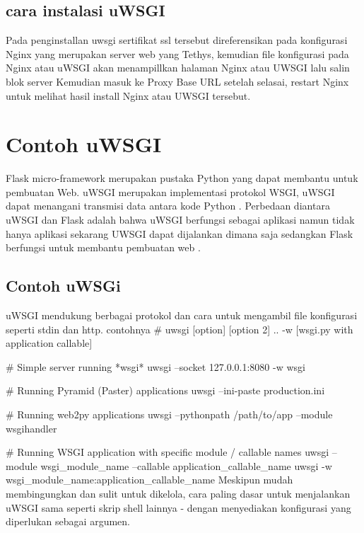 \subsection {cara instalasi uWSGI}
Pada penginstallan uwsgi sertifikat ssl tersebut direferensikan pada konfigurasi Nginx yang merupakan server web yang Tethys, kemudian file konfigurasi pada Nginx atau uWSGI akan menampillkan halaman Nginx atau UWSGI lalu salin blok server Kemudian masuk ke Proxy Base URL setelah selasai, restart Nginx untuk melihat hasil install Nginx atau UWSGI tersebut\cite{pellicer2016desarrollo}.

\section{Contoh uWSGI}
Flask micro-framework merupakan pustaka Python yang dapat membantu untuk pembuatan Web. uWSGI merupakan implementasi protokol WSGI, uWSGI dapat menangani transmisi data
antara kode Python . Perbedaan diantara uWSGI dan Flask adalah bahwa uWSGI berfungsi sebagai aplikasi namun tidak hanya aplikasi sekarang UWSGI dapat dijalankan dimana saja sedangkan Flask berfungsi untuk membantu pembuatan web \cite{mulerolinked}.

\subsection{Contoh uWSGi}
uWSGI mendukung berbagai protokol dan cara untuk mengambil file  konfigurasi seperti stdin dan http. contohnya
# uwsgi [option] [option 2] .. -w [wsgi.py with application callable]

# Simple server running *wsgi*
uwsgi --socket 127.0.0.1:8080 -w wsgi

# Running Pyramid (Paster) applications
uwsgi --ini-paste production.ini

# Running web2py applications
uwsgi --pythonpath /path/to/app --module wsgihandler

# Running WSGI application with specific module / callable names
uwsgi --module wsgi_module_name --callable application_callable_name
uwsgi -w wsgi_module_name:application_callable_name
Meskipun mudah membingungkan dan sulit untuk dikelola, cara paling dasar untuk menjalankan uWSGI sama seperti skrip shell lainnya - dengan menyediakan konfigurasi yang diperlukan sebagai argumen\cite{cencini2017data}.



